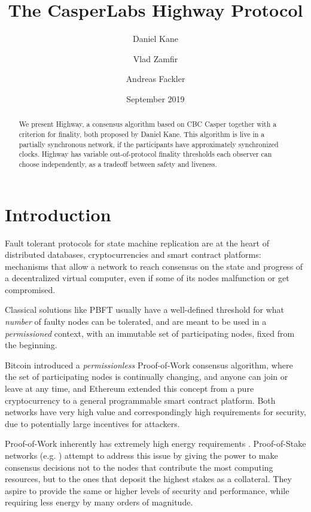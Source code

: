\documentclass[12pt]{article}
\title{The CasperLabs Highway Protocol}
\author[1]{Daniel Kane}
\author[2]{Vlad Zamfir}
\author[3]{Andreas Fackler}
\affil[1]{Computer Science and Engineering Department, UC San Diego}
\affil[2]{Ethereum Research}
\affil[3]{CasperLabs LLC}
\date{September 2019}
\begin{document}
\maketitle
\tableofcontents
\pagebreak


\begin{abstract}
We present Highway, a consensus algorithm based on CBC Casper together with a criterion for finality, both proposed by Daniel Kane. This algorithm is live in a partially synchronous network, if the participants have approximately synchronized clocks. Highway has variable out-of-protocol finality thresholds each observer can choose independently, as a tradeoff between safety and liveness.
\end{abstract}


\section*{Introduction}

Fault tolerant protocols for state machine replication are at the heart of distributed databases, cryptocurrencies and smart contract platforms: mechanisms that allow a network to reach consensus on the state and progress of a decentralized virtual computer, even if some of its nodes malfunction or get compromised.

Classical solutions like PBFT \cite{castro1999practical} usually have a well-defined threshold for what \emph{number} of faulty nodes can be tolerated, and are meant to be used in a \emph{permissioned} context, with an immutable set of participating nodes, fixed from the beginning.

Bitcoin \cite{nakamoto2008bitcoin} introduced a \emph{permissionless} Proof-of-Work consensus algorithm, where the set of participating nodes is continually changing, and anyone can join or leave at any time, and Ethereum \cite{wood2014ethereum} extended this concept from a pure cryptocurrency to a general programmable smart contract platform. Both networks have very high value and correspondingly high requirements for security, due to potentially large incentives for attackers.

Proof-of-Work inherently has extremely high energy requirements \cite{de2018bitcoin}. Proof-of-Stake networks (e.g. \cite{kiayias2017ouroboros}) attempt to address this issue by giving the power to make consensus decisions not to the nodes that contribute the most computing resources, but to the ones that deposit the highest stakes as a collateral. They aspire to provide the same or higher levels of security and performance, while requiring less energy by many orders of magnitude.
\end{document}
